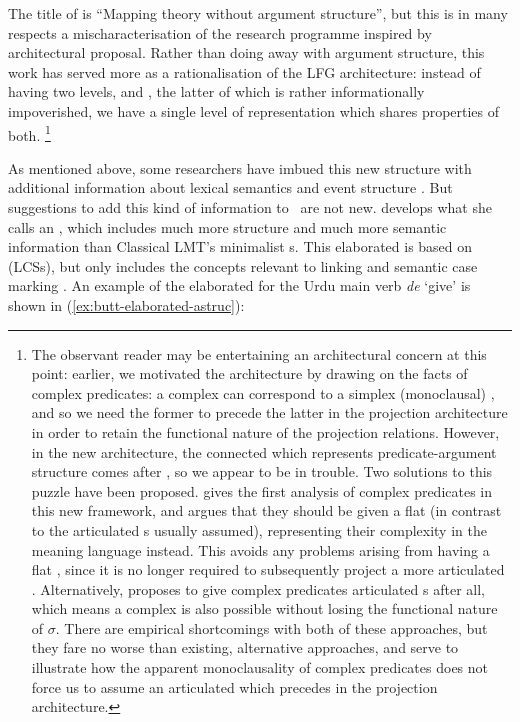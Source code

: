 \documentclass[output=paper]{langscibook}
\begin{document}
The title of \citet{findlay2017mapping} is ``Mapping theory without argument
structure'', but this is in many respects a mischaracterisation of the research
programme inspired by  architectural proposal. Rather than
doing away with argument structure, this work has served more as a
rationalisation of the LFG architecture: instead of having two levels, \astruc{}
and \sstruc{}, the latter of which is rather informationally impoverished, we
have a single level of representation which shares properties of both.%
%
\footnote{The observant reader may be entertaining an architectural concern at
  this point: earlier, we motivated the \citet{butt1997architecture}
  architecture by drawing on the facts of complex predicates: a complex
  \astruc{} can correspond to a simplex (monoclausal) \fstruc{}, and so we need
  the former to precede the latter in the projection architecture in order to
  retain the functional nature of the projection relations. However, in the new
  architecture, the connected \sstruc{} which represents predicate-argument
  structure comes after \fstruc{}, so we appear to be in trouble. Two solutions
  to this puzzle have been proposed. \citet{Lowe2015} gives the first analysis
  of complex predicates in this new framework, and argues that they should be
  given a flat \sstruc{} (in contrast to the articulated \astruc{}s usually
  assumed), representing their complexity in the meaning language instead. This
  avoids any problems arising from having a flat \fstruc{}, since it is no
  longer required to subsequently project a more articulated \sstruc.
  Alternatively, \citet{Lovestrand2020} proposes to give complex predicates
  articulated \fstruc{}s after all, which means a complex \sstruc{} is also
  possible without losing the functional nature of $\sigma$. There are empirical
  shortcomings with both of these approaches, but they fare no worse than
  existing, alternative approaches, and serve to illustrate how the apparent
  monoclausality of complex predicates does not force us to assume an
  articulated \astruc{} which precedes \fstruc{} in the projection
  architecture.}


As mentioned above, some researchers have imbued this new structure with
additional information about lexical semantics and event structure
\citep[e.g.][]{Lowe2014,Lovestrand2018}. But suggestions to add this kind of
information to \astruc\ are not new. \citet{Butt1995} develops what she calls an
 \citep[133]{Butt1995}, which includes much more
structure and much more semantic information than Classical LMT's minimalist
\astruc{}s. This elaborated \astruc{} is based on
  (LCSs), but
only includes the concepts relevant to linking and semantic case marking
\citep[143]{Butt1995}. An example of the elaborated \astruc{} for the Urdu main
verb \textit{de} `give' is shown in (\ref{ex:butt-elaborated-astruc}):
\end{document}
